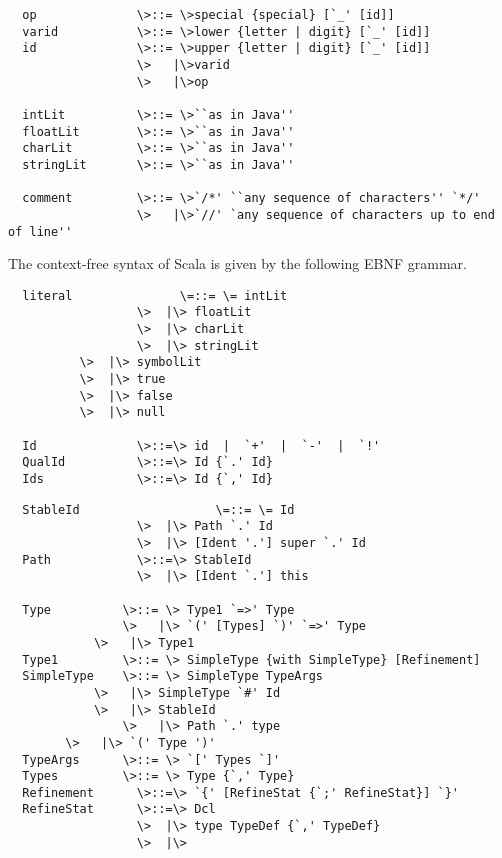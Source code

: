 \documentclass[11pt]{report}
\begin{document}
\begin{itemize}
\begin{verbatim}
  op              \>::= \>special {special} [`_' [id]]
  varid           \>::= \>lower {letter | digit} [`_' [id]]
  id              \>::= \>upper {letter | digit} [`_' [id]]
                  \>   |\>varid
                  \>   |\>op

  intLit          \>::= \>``as in Java''
  floatLit        \>::= \>``as in Java''
  charLit         \>::= \>``as in Java''
  stringLit       \>::= \>``as in Java''

  comment         \>::= \>`/*' ``any sequence of characters'' `*/'
                  \>   |\>`//' `any sequence of characters up to end of line''
\end{verbatim}

The context-free syntax of Scala is given by the following EBNF
grammar.

\begin{verbatim}
  literal               \=::= \= intLit
                  \>  |\> floatLit
                  \>  |\> charLit
                  \>  |\> stringLit
		  \>  |\> symbolLit
		  \>  |\> true
		  \>  |\> false
		  \>  |\> null

  Id              \>::=\> id  |  `+'  |  `-'  |  `!'
  QualId          \>::=\> Id {`.' Id}
  Ids             \>::=\> Id {`,' Id}
\end{verbatim}

\begin{verbatim}
  StableId                   \=::= \= Id
                  \>  |\> Path `.' Id
                  \>  |\> [Ident '.'] super `.' Id
  Path            \>::=\> StableId
                  \>  |\> [Ident `.'] this

  Type          \>::= \> Type1 `=>' Type
                \>   |\> `(' [Types] `)' `=>' Type
	        \>   |\> Type1
  Type1         \>::= \> SimpleType {with SimpleType} [Refinement]
  SimpleType   	\>::= \> SimpleType TypeArgs
	        \>   |\> SimpleType `#' Id
	        \>   |\> StableId
                \>   |\> Path `.' type
		\>   |\> `(' Type ')'
  TypeArgs     	\>::= \> `[' Types `]'
  Types         \>::= \> Type {`,' Type}
  Refinement      \>::=\> `{' [RefineStat {`;' RefineStat}] `}'
  RefineStat      \>::=\> Dcl
                  \>  |\> type TypeDef {`,' TypeDef}
                  \>  |\>


\end{verbatim}
\end{itemize}
\end{document}
